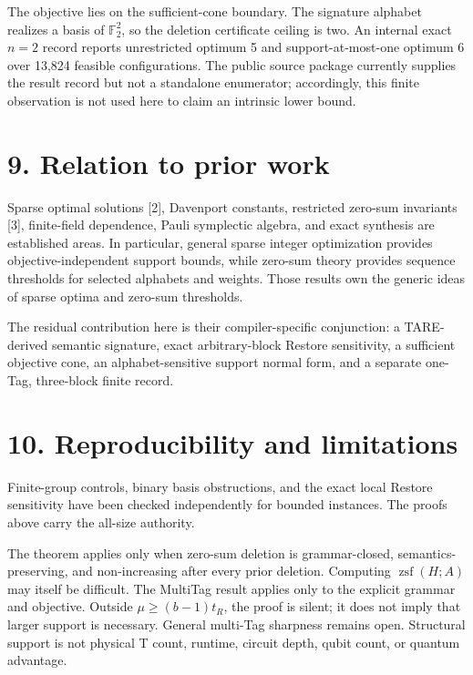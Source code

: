 \documentclass[
  11pt,
]{article}
\begin{document}
The objective lies on the sufficient-cone boundary. The signature
alphabet realizes a basis of \(\mathbb F_2^2\), so the deletion
certificate ceiling is two. An internal exact \(n=2\) record reports
unrestricted optimum 5 and support-at-most-one optimum 6 over 13,824
feasible configurations. The public source package currently supplies
the result record but not a standalone enumerator; accordingly, this
finite observation is not used here to claim an intrinsic lower bound.

\hypertarget{relation-to-prior-work}{%
\section{9. Relation to prior work}\label{relation-to-prior-work}}

Sparse optimal solutions {[}2{]}, Davenport constants, restricted
zero-sum invariants {[}3{]}, finite-field dependence, Pauli symplectic
algebra, and exact synthesis are established areas. In particular,
general sparse integer optimization provides objective-independent
support bounds, while zero-sum theory provides sequence thresholds for
selected alphabets and weights. Those results own the generic ideas of
sparse optima and zero-sum thresholds.

The residual contribution here is their compiler-specific conjunction: a
TARE-derived semantic signature, exact arbitrary-block Restore
sensitivity, a sufficient objective cone, an alphabet-sensitive support
normal form, and a separate one-Tag, three-block finite record.

\hypertarget{reproducibility-and-limitations}{%
\section{10. Reproducibility and
limitations}\label{reproducibility-and-limitations}}

Finite-group controls, binary basis obstructions, and the exact local
Restore sensitivity have been checked independently for bounded
instances. The proofs above carry the all-size authority.

The theorem applies only when zero-sum deletion is grammar-closed,
semantics-preserving, and non-increasing after every prior deletion.
Computing \(\operatorname{zsf}(H; A)\) may itself be difficult. The
MultiTag result applies only to the explicit grammar and objective.
Outside \(\mu\ge(b-1)t_R\), the proof is silent; it does not imply that
larger support is necessary. General multi-Tag sharpness remains open.
Structural support is not physical T count, runtime, circuit depth,
qubit count, or quantum advantage.
\end{document}

